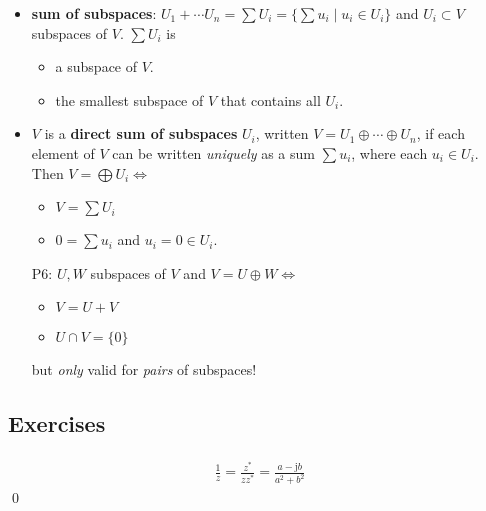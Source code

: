 \documentclass[11pt,notitlepage,oneside]{article}
\newcommand{\exo}[1]{%
\addtocontents{toc}{\protect\setcounter{tocdepth}{2}}%
\paragraph{#1}}
\begin{document}
\begin{itemize}
\item \textbf{sum of subspaces}: $U_1+\cdots U_n = \sum U_i =\{\sum u_i\mid u_i\in U_i\}$ and $U_i\subset V$ subspaces of $V$. $\sum U_i$ is
\begin{itemize}
\item a subspace of $V$.
\item the smallest subspace of $V$ that contains all $U_i$.
\end{itemize}

\item $V$ is a \textbf{direct sum of subspaces} $U_i$, written $V=U_1\oplus\cdots\oplus U_n$, if each element of $V$ can be written \emph{uniquely} as a sum $\sum u_i$, where each $u_i\in U_i$. 
Then $V=\bigoplus U_i \iff$
\begin{itemize}
\item $V = \sum U_i$
\item $0=\sum u_i$ and $u_i=0 \in U_i$.
\end{itemize}

\item[P6:\label{it:P1_6}] $U,W$ subspaces of $V$ and $V=U\oplus W \iff$
\begin{itemize}
\item $V=U+V$
\item $U\cap V=\{0\}$
\end{itemize}
but \emph{only} valid for \emph{pairs} of subspaces!

\end{itemize}

\subsection*{Exercises}
\exo{}
\begin{align*}
\frac{1}{z} = \frac{z^*}{zz^*}=\frac{a-\mathrm{j}b}{a^2 + b^2}
\end{align*}\qed
\end{document}
